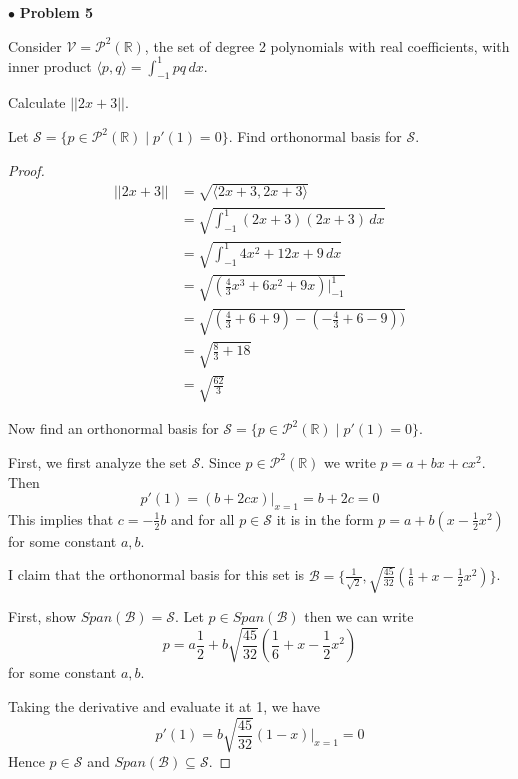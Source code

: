 \documentclass{article}
\begin{document}
\newpage
$ \bullet$ \textbf{Problem 5}
\medskip

\begin{itshape}
Consider $\mathcal{V} = \mathcal{P}^2(\mathbb{R})$, the set of degree 2 polynomials with real coefficients, with inner product $\langle p,q \rangle = \int_{-1}^{1} pq \,dx$.

Calculate $|| 2x+3||$.

Let $\mathcal{S} = \{ p \in \mathcal{P}^2(\mathbb{R}) \; | \; p'(1) =0 \}$. Find orthonormal basis for $\mathcal{S}$.
\end{itshape}
\medskip

\begin{proof}
$ $\newline
\begin{align*}
||2x+3|| &= \sqrt{\langle 2x+3, 2x+3 \rangle} \\
&= \sqrt{\int_{-1}^{1} (2x+3)(2x+3) \, dx} \\
&= \sqrt{\int_{-1}^{1} 4x^2+12x+9 \, dx} \\
&= \sqrt{(\frac{4}{3}x^3 +6x^2+9x) |^{1}_{-1}} \\
&= \sqrt{(\frac{4}{3}+6+9)-(-\frac{4}{3}+6-9))}  \\
&= \sqrt{\frac{8}{3}+18} \\
&= \sqrt{\frac{62}{3}}
\end{align*}
\bigskip

Now find an orthonormal basis for $\mathcal{S} = \{ p \in \mathcal{P}^2(\mathbb{R}) \; | \; p'(1) =0 \}$.

First, we first analyze the set $\mathcal{S}$. Since $p \in \mathcal{P}^2(\mathbb{R})$ we write $p = a+bx+cx^2$. Then 
$$ p'(1) = (b+2cx)|_{x=1} = b+2c = 0$$
This implies that $c=-\frac{1}{2}b$ and for all $p \in \mathcal{S}$ it is in the form $p = a+b(x-\frac{1}{2}x^2)$ for some constant $a,b$.

I claim that the orthonormal basis for this set is $\mathcal{B} = \{ \frac{1}{\sqrt{2}}, \sqrt{\frac{45}{32}}(\frac{1}{6}+x-\frac{1}{2}x^2) \}$.
\medskip

First, show $Span(\mathcal{B}) = \mathcal{S}$. 
Let $p \in Span(\mathcal{B})$ then we can write 
$$
p = a\frac{1}{2} + b \sqrt{\frac{45}{32}}(\frac{1}{6}+x-\frac{1}{2}x^2) 
$$
for some constant $a,b$.

Taking the derivative and evaluate it at 1, we have 
$$p'(1) = b\sqrt{\frac{45}{32}}(1-x)|_{x=1} = 0$$
Hence $p \in \mathcal{S}$ and $Span(\mathcal{B}) \subseteq \mathcal{S}$.


\end{proof}
\end{document}
